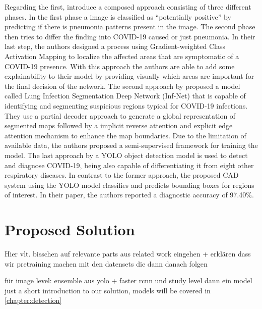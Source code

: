 Regarding the first, \citeauthor{brunese2020explainable} \autocite{brunese2020explainable} introduce a composed approach consisting of three different phases. In the first phase a image is classified as \enquote{potentially positive} by predicting if there is pneumonia patterns present in the image. The second phase then tries to differ the finding into COVID-19 caused or just pneumonia. In their last step, the authors designed a process using Gradient-weighted Class Activation Mapping to localize the affected areas that are symptomatic of a COVID-19 presence. With this approach the authors are able to add some explainability to their model by providing visually which areas are important for the final decision of the network.\newline
The second approach by \citeauthor{fan2020inf} \autocite{fan2020inf} proposed a model called Lung Infection Segmentation Deep Network (Inf-Net) that is capable of identifying and segmenting suspicious regions typical for COVID-19 infections. They use a partial decoder approach to generate a global representation of segmented maps followed by a implicit reverse attention and explicit edge attention mechanism to enhance the map boundaries. Due to the limitation of available data, the authors proposed a semi-supervised framework for training the model.\newline
The last approach by \citeauthor{al2021fast} \autocite{al2021fast} a \ac{YOLO} object detection model \autocite{yoloOriginal} is used to detect and diagnose COVID-19, being also capable of differentiating it from eight other respiratory diseases. In contrast to the former approach, the proposed \ac{CAD} system using the \ac{YOLO} model classifies and predicts bounding boxes for regions of interest. In their paper, the authors reported a diagnostic accuracy of 97.40\%.




\section{Proposed Solution}
 Hier vlt. bisschen auf relevante parts aus related work eingehen + erklären dass wir pretraining machen mit den datensets die dann danach folgen

für image level: ensemble aus yolo + faster rcnn und study level dann ein model 
just a short introduction to our solution, models will be covered in \vref{chapter:detection}